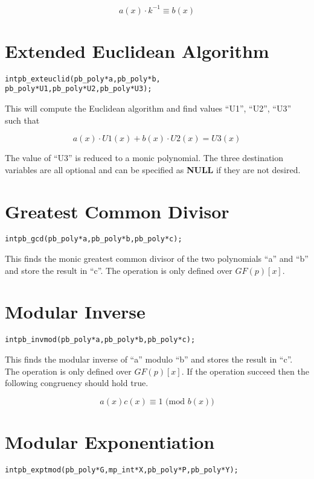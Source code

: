\documentclass[b5paper]{book}
\begin{document}
\begin{equation}
a(x) \cdot k^{-1} \equiv b(x)
\end{equation}

\section{Extended Euclidean Algorithm}
\begin{alltt}
int pb_exteuclid(pb_poly *a, pb_poly *b, 
                 pb_poly *U1, pb_poly *U2, pb_poly *U3);
\end{alltt}

This will compute the Euclidean algorithm and find values ``U1'', ``U2'', ``U3'' such that 

\begin{equation}
a(x) \cdot U1(x) + b(x) \cdot U2(x) = U3(x)
\end{equation}

The value of ``U3'' is reduced to a monic polynomial.  The three destination variables are all optional and can
be specified as \textbf{NULL} if they are not desired.

\section{Greatest Common Divisor}
\begin{alltt}
int pb_gcd(pb_poly *a, pb_poly *b, pb_poly *c);
\end{alltt}
This finds the monic greatest common divisor of the two polynomials ``a'' and ``b'' and store the result in ``c''.  The
operation is only defined over $GF(p)[x]$.  

\section{Modular Inverse}
\begin{alltt}
int pb_invmod(pb_poly *a, pb_poly *b, pb_poly *c);
\end{alltt}
This finds the modular inverse of ``a'' modulo ``b'' and stores the result in ``c''.  The operation is only defined over 
$GF(p)[x]$.  If the operation succeed then the following congruency should hold true.

\begin{equation}
a(x)c(x) \equiv 1 \mbox{ (mod }b(x)\mbox{)}
\end{equation}

\section{Modular Exponentiation}
\begin{alltt}
int pb_exptmod (pb_poly * G, mp_int * X, pb_poly * P, pb_poly * Y);
\end{alltt}
\end{document}
